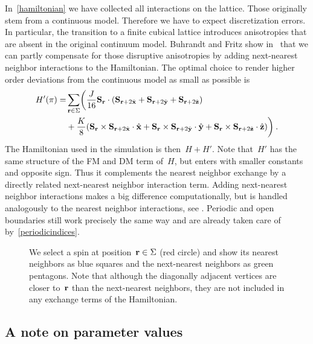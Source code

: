 In~\eqref{hamiltonian} we have collected all interactions on the lattice. Those
originally stem from a continuous model. Therefore we have to expect
discretization errors. In particular, the transition to a finite cubical
lattice introduces anisotropies that are absent in the original continuum model.
Buhrandt and Fritz show in~\cite{skyrmionlattice} that we can partly compensate
for those disruptive anisotropies by adding next-nearest neighbor interactions
to the Hamiltonian. The optimal choice to render higher order deviations from
the continuous model as small as possible is
%
\begin{align}\label{hamiltonianfix}
  H'(\pi) = & \sum_{\mathbf{r} \in \Sigma} \biggl(
  \frac{J}{16} \mathbf{S}_{\mathbf{r}} \cdot (\mathbf{S}_{\mathbf{r}+2\hat{\mathbf{x}}} + \mathbf{S}_{\mathbf{r}+2\hat{\mathbf{y}}} + \mathbf{S}_{\mathbf{r}+2\hat{\mathbf{z}}})\nonumber \\
  &+ \frac{K}{8} (\mathbf{S}_{\mathbf{r}} \times \mathbf{S}_{\mathbf{r}+2\hat{\mathbf{x}}} \cdot \hat{\mathbf{x}} +
        \mathbf{S}_{\mathbf{r}} \times \mathbf{S}_{\mathbf{r}+2\hat{\mathbf{y}}} \cdot \hat{\mathbf{y}} +
        \mathbf{S}_{\mathbf{r}} \times \mathbf{S}_{\mathbf{r}+2\hat{\mathbf{z}}} \cdot \hat{\mathbf{z}})\biggr)\:.
\end{align}
%
The Hamiltonian used in the simulation is then~$H + H'$. Note that~$H'$ has the
same structure of the FM and DM term of~$H$, but enters with smaller constants
and opposite sign. Thus it complements the nearest neighbor exchange by a
directly related next-nearest neighbor interaction term. Adding next-nearest
neighbor interactions makes a big difference computationally, but is handled
analogously to the nearest neighbor interactions, see .
Periodic and open boundaries still work precisely the same way and are already
taken care of by~\eqref{periodicindices}.

\begin{figure}
  \centering
  \caption{We select a spin at position~$\mathbf{r} \in \Sigma$ (red circle) and show
  its nearest neighbors as blue squares and the next-nearest neighbors as green
  pentagons. Note that although the diagonally adjacent vertices are closer
  to~$\mathbf{r}$ than the next-nearest neighbors, they are not included in any
  exchange terms of the Hamiltonian.}
\label{fig:interact}
\end{figure}

\subsection{A note on parameter values}

